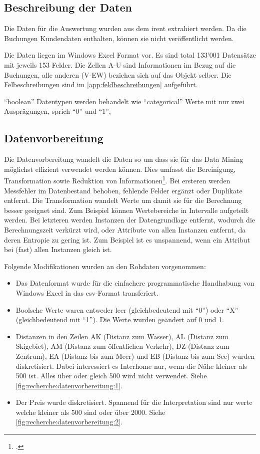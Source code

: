 \subsection{Beschreibung der Daten}
\label{sec:recherche:datenbeschaffung}
Die Daten für die Auswertung wurden aus dem \gls{irent} extrahiert werden. Da die Buchungen Kundendaten enthalten, können sie nicht veröffentlicht werden.

Die Daten liegen im Windows Excel Format vor. Es sind total 133'001 Datensätze mit jeweils 153 Felder. Die Zellen A-U sind Informationen im Bezug auf die Buchungen, alle anderen (V-EW) beziehen sich auf das Objekt selber. Die Felbeschreibungen sind im \cref{app:feldbeschreibungen} aufgeführt.

"`boolean"' Datentypen werden behandelt wie "`categorical"' Werte mit nur zwei Ausprägungen, sprich "`0"' und "`1"',

\subsection{Datenvorbereitung}
\label{sec:recherche:datenvorbereitung}
Die Datenvorbereitung wandelt die Daten so um dass sie für das Data Mining möglichst effizient verwendet werden können. Dies umfasst die Bereinigung, Transformation sowie Reduktion von Informationen\footcite{feature_selection_2017-01-04}. Bei ersteren werden Messfehler im Datenbestand behoben, fehlende Felder ergänzt oder Duplikate entfernt. Die Transformation wandelt Werte um damit sie für die Berechnung besser geeignet sind. Zum Beispiel können Wertebereiche in Intervalle aufgeteilt werden. Bei letzteren werden Instanzen der Datengrundlage entfernt, wodurch die Berechnungszeit verkürzt wird, oder Attribute von allen Instanzen entfernt, da deren Entropie zu gering ist. Zum Beispiel ist es unspannend, wenn ein Attribut bei (fast) allen Instanzen gleich ist. 

Folgende Modifikationen wurden an den Rohdaten vorgenommen:
\begin{itemize}
\item Das Datenformat wurde für die einfachere programmatische Handhabung von Windows Excel in das \gls{csv}-Format transferiert.
\item Boolsche Werte waren entweder leer (gleichbedeutend mit "`0"') oder "`X"' (gleichbedeutend mit "`1"'). Die Werte wurden geändert auf 0 und 1.
\item Distanzen in den Zeilen AK (Distanz zum Wasser), AL (Distanz zum Skigebiet), AM (Distanz zum öffentlichen Verkehr), DZ (Distanz zum Zentrum), EA (Distanz bis zum Meer) und EB (Distanz bis zum See) wurden diskretisiert. Dabei interessiert es Interhome nur, wenn die Nähe kleiner als 500 ist. Alles über oder gleich 500 wird nicht verwendet. Siehe \cref{fig:recherche:datenvorbereitung:1}.
\item Der Preis wurde diskretisiert. Spannend für die Interpretation sind nur werte welche kleiner als 500 sind oder über 2000. Siehe \cref{fig:recherche:datenvorbereitung:2}.
\end{itemize}

